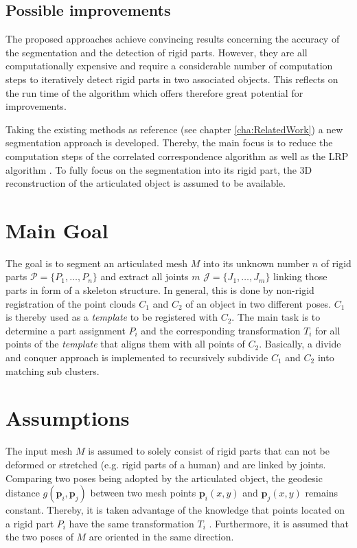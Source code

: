 \subsection{Possible improvements}


The proposed approaches achieve convincing results concerning the accuracy of the segmentation and the detection of rigid parts. However, they are all computationally expensive and require a considerable number of computation steps to iteratively detect rigid parts in two associated objects. This reflects on the run time of the algorithm which offers therefore great potential for improvements.

Taking the existing methods as reference (see chapter \ref{cha:RelatedWork}) a new segmentation approach is developed. Thereby, the main focus is to reduce the computation steps of the correlated correspondence algorithm \cite{CorrelatedCorrespondance} as well as the LRP algorithm \cite {guo2016correspondence}. To fully focus on the segmentation into its rigid part, the 3D reconstruction of the articulated object is assumed to be available.

\section{Main Goal}

The goal is to segment an articulated mesh $M$ into its unknown number $n$ of rigid parts $\mathcal{P} =  \{P_1,\ldots,P_n\}$ and extract all joints $m$ $\mathcal{J} =  \{J_1,\ldots,J_m\}$ linking those parts in form of a skeleton structure. In general, this is done by non-rigid registration of the point clouds $C_1$ and $C_2$ of an object in two different poses. $C_1$ is thereby used as a \textit{template} to be registered with $C_2$. The main task is to determine a part assignment $P_i$ and the corresponding transformation $T_i$ for all points of the \textit{template} that aligns them with all points of $C_2$. Basically, a divide and conquer approach is implemented to recursively subdivide $C_1$ and $C_2$ into matching sub clusters. 

\section{Assumptions}

The input mesh $M$ is assumed to solely consist of rigid parts that can not be deformed or stretched (e.g. rigid parts of a human) and are linked by joints. Comparing two poses being adopted by the articulated object, the geodesic distance $g(\boldsymbol{p}_i,\boldsymbol{p}_j)$ between two mesh points $\boldsymbol{p}_i(x,y)$ and $\boldsymbol{p}_j(x,y)$ remains constant. Thereby, it is taken advantage of the knowledge that points located on a rigid part $P_i$ have the same transformation $T_i$ . Furthermore, it is assumed that the two poses of $M$ are oriented in the same direction.

